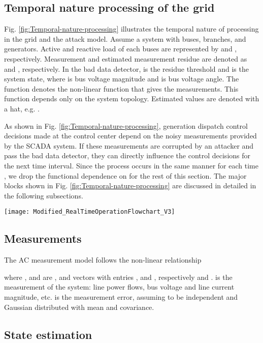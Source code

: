 \documentclass[twocolumn,english,final,journal]{IEEEtran}
\theoremstyle{plain}
\theoremstyle{definition}
\begin{document}
\subsection{Temporal nature processing of the grid}

Fig. \ref{fig:Temporal-nature-processing} illustrates the temporal
nature of processing in the grid and the attack model. Assume
a system with  buses,  branches, and  generators.
Active and reactive load of each buses are represented by 
and , respectively. Measurement and estimated measurement
residue are denoted as  and , respectively. In the bad data
detector,  is the residue threshold and 
is the system state, where  is bus voltage magnitude and 
is bus voltage angle. The function  denotes the non-linear
function that gives the measurements. This function depends only on the system
topology. Estimated values are denoted with a hat, e.g. .

As shown in Fig. \ref{fig:Temporal-nature-processing}, generation
dispatch control decisions made at the control center depend on the
noisy measurements provided by the SCADA system. If these measurements
are corrupted by an attacker and pass the bad data detector, 
they can directly influence the control decisions for the next time
interval. Since the process occurs in the same manner for each time
, we drop the functional dependence on  for the rest of this section.
The major blocks shown in Fig. \ref{fig:Temporal-nature-processing}
are discussed in detailed in the following subsections.

\begin{figure*}[tbh]
\centering{}
\texttt{[image: Modified\_RealTimeOperationFlowchart\_V3]}
\caption{Illustration of temporal processing of the grid and attack model.
\label{fig:Temporal-nature-processing}}
\end{figure*}


\subsection{Measurements}
The AC measurement model follows the non-linear relationship

where ,  and  are ,  and 
vectors with entries ,  and , respectively
 and .  is the 
measurement of the system: line power flows, bus voltage and line
current magnitude, etc.  is the 
measurement error, assuming to be independent and Gaussian distributed
with  mean and  covariance.

\subsection{State estimation \label{sub:State-estimation}}
\end{document}
